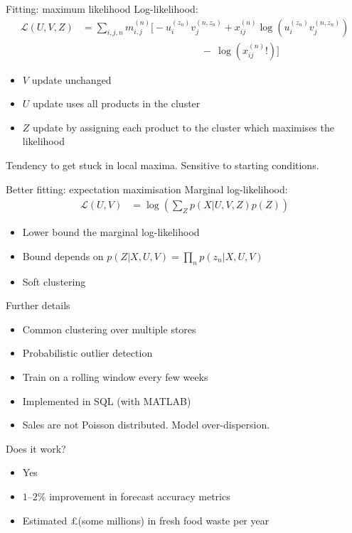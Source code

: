 \documentclass{beamer}
\begin{document}
\begin{frame}{Fitting: maximum likelihood}
 Log-likelihood:
 \begin{align}
  \mathcal{L}(U,V,Z) &= \sum_{i,j,n} m_{i,j}^{(n)} \bigg[ -u_i^{(z_n)} v_j^{(n,z_n)} + x_{ij}^{(n)}\log(u_i^{(z_n)} v_j^{(n,z_n)}) \nonumber \\
  &\qquad\qquad\qquad\qquad\qquad\qquad -\: \log(x_{ij}^{(n)}!) \bigg]
 \end{align}
 
 \begin{itemize}
  \item $V$ update unchanged
  \item $U$ update uses all products in the cluster
  \item $Z$ update by assigning each product to the cluster which maximises the likelihood
 \end{itemize}
 Tendency to get stuck in local maxima. Sensitive to starting conditions.
\end{frame}

\begin{frame}{Better fitting: expectation maximisation}
 Marginal log-likelihood:
 \begin{align}
  \mathcal{L}(U,V) &= \log\left(\sum_Z p(X|U,V,Z) p(Z)\right)
 \end{align}
 \begin{itemize}
  \item Lower bound the marginal log-likelihood
  \item Bound depends on $p(Z|X,U,V) = \prod_n p(z_n|X,U,V)$
  \item Soft clustering
 \end{itemize}
\end{frame}

\begin{frame}{Further details}
 \begin{itemize}
  \item Common clustering over multiple stores
  \item Probabilistic outlier detection
  \item Train on a rolling window every few weeks
  \item Implemented in SQL (with MATLAB)
  \item Sales are not Poisson distributed. Model over-dispersion.
 \end{itemize}
\end{frame}

\begin{frame}{Does it work?}
 \begin{itemize}
  \item Yes
  \item $1$--$2\%$ improvement in forecast accuracy metrics
  \item Estimated \pounds(some millions) in fresh food waste per year
 \end{itemize}
\end{frame}
\end{document}
